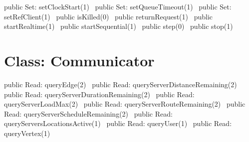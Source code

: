 public \LA{}Set: setClockStart(1)~{\nwtagstyle{}}\RA{}
public \LA{}Set: setQueueTimeout(1)~{\nwtagstyle{}}\RA{}
public \LA{}Set: setRefClient(1)~{\nwtagstyle{}}\RA{}
public \LA{}isKilled(0)~{\nwtagstyle{}}\RA{}
public \LA{}returnRequest(1)~{\nwtagstyle{}}\RA{}
public \LA{}startRealtime(1)~{\nwtagstyle{}}\RA{}
public \LA{}startSequential(1)~{\nwtagstyle{}}\RA{}
public \LA{}step(0)~{\nwtagstyle{}}\RA{}
public \LA{}stop(1)~{\nwtagstyle{}}\RA{}
\nwendcode{}\nwdocspar

\section*{Class: Communicator}
\nwenddocs{}\endmoddef{}
public \LA{}Read: queryEdge(2)~{\nwtagstyle{}}\RA{}
public \LA{}Read: queryServerDistanceRemaining(2)~{\nwtagstyle{}}\RA{}
public \LA{}Read: queryServerDurationRemaining(2)~{\nwtagstyle{}}\RA{}
public \LA{}Read: queryServerLoadMax(2)~{\nwtagstyle{}}\RA{}
public \LA{}Read: queryServerRouteRemaining(2)~{\nwtagstyle{}}\RA{}
public \LA{}Read: queryServerScheduleRemaining(2)~{\nwtagstyle{}}\RA{}
public \LA{}Read: queryServersLocationsActive(1)~{\nwtagstyle{}}\RA{}
public \LA{}Read: queryUser(1)~{\nwtagstyle{}}\RA{}
public \LA{}Read: queryVertex(1)~{\nwtagstyle{}}\RA{}
\nwendcode{}\nwdocspar
{}
\nwenddocs{}\plusendmoddef
